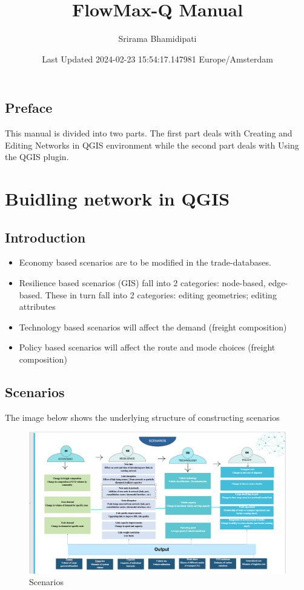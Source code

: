 \documentclass[
]{book}
\title{FlowMax-Q Manual}
\author{Srirama Bhamidipati}
\date{Last Updated 2024-02-23 15:54:17.147981 Europe/Amsterdam}
\providecommand{\tightlist}{%
  \setlength{\itemsep}{0pt}\setlength{\parskip}{0pt}}
\begin{document}
\maketitle

{
\setcounter{tocdepth}{1}
\tableofcontents
}
\hypertarget{preface}{%
\chapter*{Preface}\label{preface}}

This manual is divided into two parts. The first part deals with Creating and Editing Networks in QGIS environment while the second part deals with Using the QGIS plugin.

\hypertarget{part-buidling-network-in-qgis}{%
\part{Buidling network in QGIS}\label{part-buidling-network-in-qgis}}

\hypertarget{introduction}{%
\chapter{Introduction}\label{introduction}}

\begin{itemize}
\tightlist
\item
  Economy based scenarios are to be modified in the trade-databases.
\item
  Resilience based scenarios (GIS) fall into 2 categories: node-based, edge-based. These in turn fall into 2 categories: editing geometries; editing attributes
\item
  Technology based scenarios will affect the demand (freight composition)
\item
  Policy based scenarios will affect the route and mode choices (freight composition)
\end{itemize}

\hypertarget{scenarios}{%
\chapter{Scenarios}\label{scenarios}}

The image below shows the underlying structure of constructing scenarios

\begin{figure}
\centering
\includegraphics{"./Picture1.png"}
\caption{Scenarios}
\end{figure}
\end{document}
